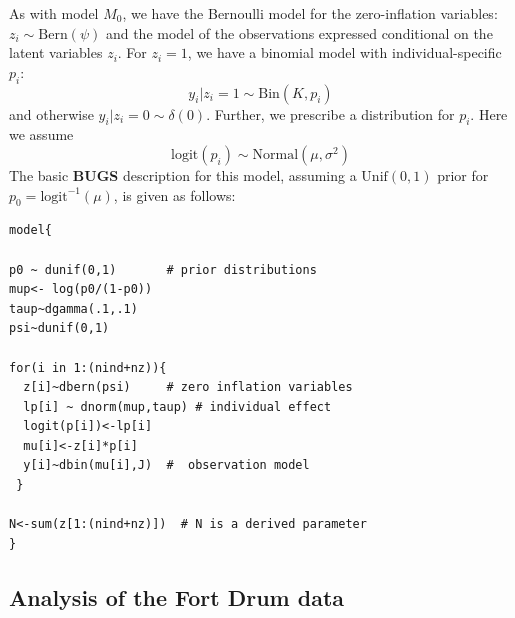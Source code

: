 As with model $M_{0}$, we have the Bernoulli model for the
zero-inflation variables: $z_{i} \sim \mbox{Bern}(\psi)$ and the model
of the observations expressed conditional on the latent variables
$z_{i}$. For $z_{i}=1$, we have a binomial model with
individual-specific $p_{i}$:
\[
y_{i}|{z_{i} \! = \! 1} \sim \mbox{Bin}(K,p_{i})
\]
and otherwise $y_{i} |{ z_{i} \! = \! 0} \sim \delta(0)$. Further, we
prescribe a distribution for $p_{i}$. Here we assume
\[
\mathrm{logit}(p_{i}) \sim \mbox{Normal}(\mu,\sigma^2)
\]
The basic {\bf BUGS} description for this model, assuming a
$\mbox{Unif}(0,1)$ prior for $p_{0} = \mbox{logit}^{-1}(\mu)$, is given
as follows:
{\small
\begin{verbatim}
model{

p0 ~ dunif(0,1)       # prior distributions
mup<- log(p0/(1-p0))
taup~dgamma(.1,.1)
psi~dunif(0,1)

for(i in 1:(nind+nz)){
  z[i]~dbern(psi)     # zero inflation variables
  lp[i] ~ dnorm(mup,taup) # individual effect
  logit(p[i])<-lp[i]
  mu[i]<-z[i]*p[i]
  y[i]~dbin(mu[i],J)  #  observation model
 }

N<-sum(z[1:(nind+nz)])  # N is a derived parameter
}
\end{verbatim}
}


\subsection{Analysis of the Fort Drum data}

